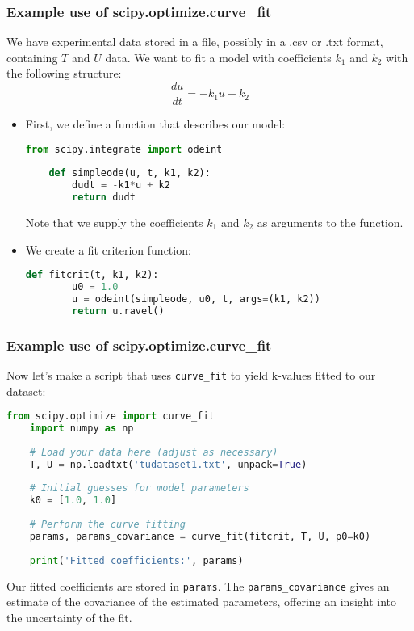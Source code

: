   \begin{frame}[fragile] 
    \frametitle{Example use of scipy.optimize.curve\_fit}
    We have experimental data stored in a file, possibly in a .csv or .txt format, containing $T$ and $U$ data. We want to fit a model with coefficients $k_1$ and $k_2$ with the following structure:
    \[
      \frac{du}{dt} = -k_1 u + k_2
    \]
    \pause
    \begin{itemize}
      \item First, we define a function that describes our model:
      \begin{lstlisting}[language=Python]
    from scipy.integrate import odeint
    
    def simpleode(u, t, k1, k2):
        dudt = -k1*u + k2
        return dudt
      \end{lstlisting}
      Note that we supply the coefficients \(k_1\) and \(k_2\) as arguments to the function.
      \pause
      \item We create a fit criterion function:
      \begin{lstlisting}[language=Python]
    def fitcrit(t, k1, k2):
        u0 = 1.0
        u = odeint(simpleode, u0, t, args=(k1, k2))
        return u.ravel()
      \end{lstlisting}
    \end{itemize}
    \end{frame}
    
    \begin{frame}[fragile] 
    \frametitle{Example use of scipy.optimize.curve\_fit}
    Now let's make a script that uses \lstinline$curve_fit$ to yield k-values fitted to our dataset:
    \pause
    \begin{lstlisting}[language=Python]
    from scipy.optimize import curve_fit
    import numpy as np
    
    # Load your data here (adjust as necessary)
    T, U = np.loadtxt('tudataset1.txt', unpack=True)
    
    # Initial guesses for model parameters
    k0 = [1.0, 1.0]
    
    # Perform the curve fitting
    params, params_covariance = curve_fit(fitcrit, T, U, p0=k0)
    
    print('Fitted coefficients:', params)
    \end{lstlisting}
    Our fitted coefficients are stored in \lstinline|params|. The \lstinline|params_covariance| gives an estimate of the covariance of the estimated parameters, offering an insight into the uncertainty of the fit.
    \end{frame}      

